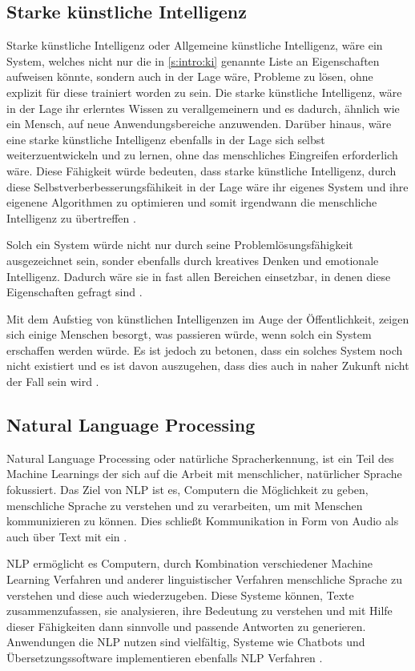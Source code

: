 \subsection{Starke künstliche Intelligenz}
Starke künstliche Intelligenz oder Allgemeine künstliche Intelligenz, 
wäre ein System, welches nicht nur die in \ref{s:intro:ki} genannte Liste an Eigenschaften aufweisen könnte, 
sondern auch in der Lage wäre, Probleme zu lösen, ohne  explizit für diese trainiert worden 
zu sein. 
Die starke künstliche Intelligenz, wäre in der Lage ihr erlerntes Wissen zu verallgemeinern und es 
dadurch, ähnlich wie ein Mensch, auf neue Anwendungsbereiche anzuwenden.
 Darüber hinaus, wäre eine starke künstliche Intelligenz ebenfalls in der 
Lage sich selbst weiterzuentwickeln und zu lernen, ohne das menschliches Eingreifen 
erforderlich wäre. Diese Fähigkeit würde bedeuten, dass starke künstliche Intelligenz,
durch diese Selbstverberbesserungsfähikeit in der Lage wäre ihr eigenes System und ihre eigenene
Algorithmen zu optimieren 
und somit irgendwann die menschliche Intelligenz zu übertreffen \cite{lanquillonKnowledgeScienceGrundlagen2023}. \par
Solch ein System würde nicht nur durch seine Problemlösungsfähigkeit ausgezeichnet sein, 
sonder ebenfalls durch kreatives Denken und emotionale Intelligenz. 
Dadurch wäre sie in fast allen Bereichen einsetzbar, in denen diese Eigenschaften 
gefragt sind \cite{lanquillonKnowledgeScienceGrundlagen2023}. \par
Mit dem Aufstieg von künstlichen Intelligenzen im Auge der Öffentlichkeit, zeigen 
sich einige Menschen besorgt, was passieren würde, wenn solch ein System
erschaffen werden würde. Es ist jedoch zu betonen, dass ein solches System  
noch nicht existiert und es ist davon auszugehen, dass dies auch in naher Zukunft
nicht der Fall sein wird \cite{leerainieExpertsImagineImpact2024}.

\subsection{Natural Language Processing}
Natural Language Processing oder natürliche Spracherkennung, ist ein Teil des Machine Learnings der sich
auf die Arbeit mit menschlicher, natürlicher Sprache fokussiert. Das Ziel von NLP ist es, Computern 
die Möglichkeit zu geben, menschliche Sprache zu verstehen und zu verarbeiten, um mit Menschen 
kommunizieren zu können. Dies schließt Kommunikation in Form von Audio als auch über Text mit ein \cite{WhatNLPNatural2021}.\par
NLP ermöglicht es Computern, durch Kombination verschiedener Machine Learning Verfahren und
anderer linguistischer Verfahren menschliche Sprache zu verstehen und diese auch wiederzugeben.
Diese Systeme können, Texte zusammenzufassen, sie analysieren, ihre Bedeutung
zu verstehen und mit Hilfe dieser Fähigkeiten dann sinnvolle und passende Antworten zu generieren.
Anwendungen die NLP nutzen sind vielfältig, Systeme wie Chatbots und Übersetzungssoftware
implementieren ebenfalls NLP Verfahren \cite{WhatNLPNatural2021}.\par

